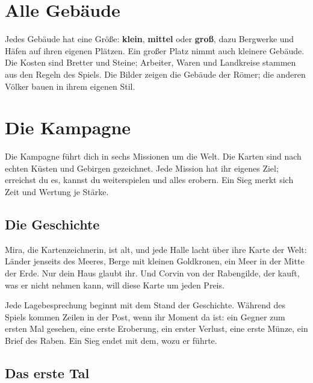 \documentclass[a4paper,11pt,oneside,DIV=12,headings=small,toc=chapterentrydotfill]{scrbook}
\begin{document}
\chapter{Alle Gebäude}

Jedes Gebäude hat eine Größe: \textbf{klein}, \textbf{mittel} oder \textbf{groß}, dazu Bergwerke und Häfen
auf ihren eigenen Plätzen. Ein großer Platz nimmt auch kleinere Gebäude. Die Kosten sind Bretter und Steine;
Arbeiter, Waren und Landkreise stammen aus den Regeln des Spiels. Die Bilder zeigen die Gebäude der Römer;
die anderen Völker bauen in ihrem eigenen Stil.



\chapter{Die Kampagne}

Die Kampagne führt dich in sechs Missionen um die Welt. Die Karten sind nach echten Küsten und Gebirgen
gezeichnet. Jede Mission hat ihr eigenes Ziel; erreichst du es, kannst du weiterspielen und alles erobern.
Ein Sieg merkt sich Zeit und Wertung je Stärke.

\section{Die Geschichte}
\begin{storybox}
Mira, die Kartenzeichnerin, ist alt, und jede Halle lacht über ihre Karte der Welt: Länder jenseits des
Meeres, Berge mit kleinen Goldkronen, ein Meer in der Mitte der Erde. Nur dein Haus glaubt ihr. Und
Corvin von der Rabengilde, der kauft, was er nicht nehmen kann, will diese Karte um jeden Preis.
\end{storybox}
Jede Lagebesprechung beginnt mit dem Stand der Geschichte. Während des Spiels kommen Zeilen in der Post, wenn
ihr Moment da ist: ein Gegner zum ersten Mal gesehen, eine erste Eroberung, ein erster Verlust, eine erste
Münze, ein Brief des Raben. Ein Sieg endet mit dem, wozu er führte.

\section{Das erste Tal}
\end{document}

